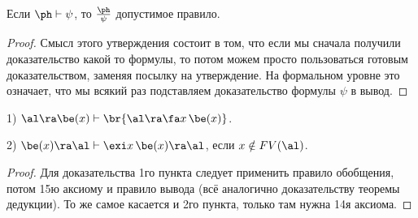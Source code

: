 \documentclass[a4paper,draft]{article}
\def\exis#1{\exi#1\,}
\def\fora#1{\fa#1\,}
\begin{document}
\begin{stm}
  Если $\ph \vdash \psi$, то $\frac{\ph}{\psi}$ допустимое правило.
\end{stm}
\begin{proof}
  Смысл этого утверждения состоит в том, что если мы сначала получили доказательство
  какой то формулы, то потом можем просто пользоваться готовым доказательством, заменяя
  посылку на утверждение. На формальном уровне это означает, что мы всякий раз подставляем
  доказательство формулы $\psi$ в вывод.
\end{proof}

\begin{stm}

  1) $\al \ra \be(x)  \vdash \br{\al \ra \fora{x}\be(x)}$.

  2) $\be(x) \ra \al \vdash \exis{x}\be(x) \ra \al$, если $x \notin FV(\al)$.
\end{stm}
\begin{proof}
Для доказательства 1го пункта следует применить правило обобщения, потом 15ю аксиому и правило вывода
(всё аналогично доказательству теоремы дедукции). То же самое касается и 2го пункта, только там нужна 14я аксиома.
\end{proof}
\end{document}

